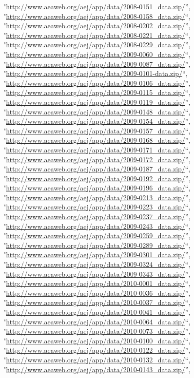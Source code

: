 \documentclass[]{article}
\begin{document}
\begin{itemize}
  "\url{http://www.aeaweb.org/aej/app/data/2008-0151_data.zip/}'',
  "\url{http://www.aeaweb.org/aej/app/data/2008-0158_data.zip/}``,
  "\url{http://www.aeaweb.org/aej/app/data/2008-0202_data.zip/}'',
  "\url{http://www.aeaweb.org/aej/app/data/2008-0221_data.zip/}``,
  "\url{http://www.aeaweb.org/aej/app/data/2008-0229_data.zip/}'',
  "\url{http://www.aeaweb.org/aej/app/data/2009-0060_data.zip/}``,
  "\url{http://www.aeaweb.org/aej/app/data/2009-0087_data.zip/}'',
  "\url{http://www.aeaweb.org/aej/app/data/2009-0101-data.zip/}``,
  "\url{http://www.aeaweb.org/aej/app/data/2009-0106_data.zip/}'',
  "\url{http://www.aeaweb.org/aej/app/data/2009-0115_data.zip/}``,
  "\url{http://www.aeaweb.org/aej/app/data/2009-0119_data.zip/}'',
  "\url{http://www.aeaweb.org/aej/app/data/2009-0148_data.zip/}``,
  "\url{http://www.aeaweb.org/aej/app/data/2009-0154_data.zip/}'',
  "\url{http://www.aeaweb.org/aej/app/data/2009-0157_data.zip/}``,
  "\url{http://www.aeaweb.org/aej/app/data/2009-0168_data.zip/}'',
  "\url{http://www.aeaweb.org/aej/app/data/2009-0171_data.zip/}``,
  "\url{http://www.aeaweb.org/aej/app/data/2009-0172_data.zip/}'',
  "\url{http://www.aeaweb.org/aej/app/data/2009-0187_data.zip/}``,
  "\url{http://www.aeaweb.org/aej/app/data/2009-0192_data.zip/}'',
  "\url{http://www.aeaweb.org/aej/app/data/2009-0196_data.zip/}``,
  "\url{http://www.aeaweb.org/aej/app/data/2009-0213_data.zip/}'',
  "\url{http://www.aeaweb.org/aej/app/data/2009-0223_data.zip/}``,
  "\url{http://www.aeaweb.org/aej/app/data/2009-0237_data.zip/}'',
  "\url{http://www.aeaweb.org/aej/app/data/2009-0243_data.zip/}``,
  "\url{http://www.aeaweb.org/aej/app/data/2009-0259_data.zip/}'',
  "\url{http://www.aeaweb.org/aej/app/data/2009-0289_data.zip/}``,
  "\url{http://www.aeaweb.org/aej/app/data/2009-0301_data.zip/}'',
  "\url{http://www.aeaweb.org/aej/app/data/2009-0324_data.zip/}``,
  "\url{http://www.aeaweb.org/aej/app/data/2009-0343_data.zip/}'',
  "\url{http://www.aeaweb.org/aej/app/data/2010-0001_data.zip/}``,
  "\url{http://www.aeaweb.org/aej/app/data/2010-0036_data.zip/}'',
  "\url{http://www.aeaweb.org/aej/app/data/2010-0037_data.zip/}``,
  "\url{http://www.aeaweb.org/aej/app/data/2010-0041_data.zip/}'',
  "\url{http://www.aeaweb.org/aej/app/data/2010-0064_data.zip/}``,
  "\url{http://www.aeaweb.org/aej/app/data/2010-0073_data.zip/}'',
  "\url{http://www.aeaweb.org/aej/app/data/2010-0100_data.zip/}``,
  "\url{http://www.aeaweb.org/aej/app/data/2010-0122_data.zip/}'',
  "\url{http://www.aeaweb.org/aej/app/data/2010-0132_data.zip/}``,
  "\url{http://www.aeaweb.org/aej/app/data/2010-0143_data.zip/}'',

\end{itemize}
\end{document}
